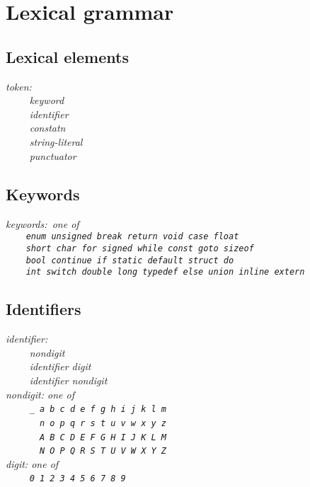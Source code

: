 \documentclass[12pt]{report}
\def\|{\verb|}
\begin{document}
\chapter{Lexical grammar}
\rm
\section{Lexical elements}
\it
\noindent
token:\\
\|    | keyword\\
\|    | identifier\\
\|    | constatn\\
\|    | string-literal\\
\|    | punctuator\\

\rm
\section{Keywords}
\it
\noindent
keywords: {\rm one of}\\
\|    | \verb+enum unsigned break return void case float+ \\
\|    | \verb+short char for signed while const goto sizeof+ \\
\|    | \verb+bool continue if static default struct do+ \\
\|    | \verb+int switch double long typedef else union inline extern+ \\

\rm
\section{Identifiers}
\it
\noindent
identifier:\\
\|    | nondigit\\
\|    | identifier digit\\
\|    | identifier nondigit\\

\noindent
nondigit: {\rm one of}\\
\|    | \verb+_ a b c d e f g h i j k l m+\\
\|    | \verb+  n o p q r s t u v w x y z+\\
\|    | \verb+  A B C D E F G H I J K L M+\\
\|    | \verb+  N O P Q R S T U V W X Y Z+\\

\noindent
digit: {\rm one of}\\
\|    | \verb+0 1 2 3 4 5 6 7 8 9+\\
\end{document}
